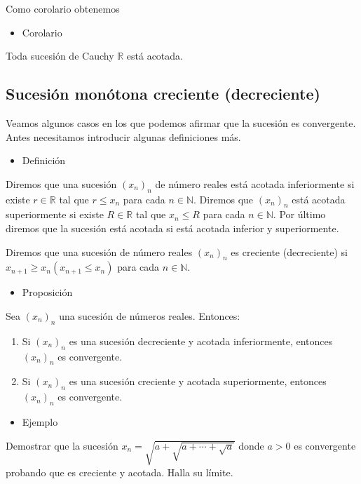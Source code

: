 \documentclass[12pt]{article}
\begin{document}
Como corolario obtenemos 

\begin{itemize}[label=\color{red}\textbullet, leftmargin=*]
	\item \color{lightblue}Corolario
\end{itemize}
Toda sucesión de Cauchy $\mathbb{R}$ está acotada.
\subsection{Sucesión monótona creciente (decreciente)}
Veamos algunos casos en los que podemos afirmar que la sucesión es convergente. Antes necesitamos introducir algunas definiciones más.
\begin{itemize}[label=\color{red}\textbullet, leftmargin=*]
	\item \color{lightblue}Definición
\end{itemize}
Diremos que una sucesión $(x_n)_n$ de número reales está acotada inferiormente si existe $r\in\mathbb{R}$ tal que $r\le x_n$ para cada $n\in\mathbb{N}$. Diremos que $(x_n)_n$ está acotada superiormente si existe $R\in\mathbb{R}$ tal que $x_n\le R$ para cada $n\in\mathbb{N}$. Por último diremos que la sucesión está acotada si está acotada inferior y superiormente.

Diremos que una sucesión de número reales $(x_n)_n$ es creciente (decreciente) si $x_{n+1}\ge x_n(x_{n+1}\le x_n)$ para cada $n\in\mathbb{N}$.
\begin{itemize}[label=\color{red}\textbullet, leftmargin=*]
	\item \color{lightblue}Proposición
\end{itemize}
Sea $(x_n)_n$ una sucesión de números reales. Entonces:
\begin{enumerate}[label=\arabic*)]
	\item Si $(x_n)_n$ es una sucesión decreciente y acotada inferiormente, entonces $(x_n)_n$ es convergente.
	\item Si $(x_n)_n$ es una sucesión creciente y acotada superiormente, entonces $(x_n)_n$ es convergente.
\end{enumerate}
\begin{itemize}[label=\color{red}\textbullet, leftmargin=*]
	\item \color{lightblue}Ejemplo
\end{itemize}
Demostrar que la sucesión $x_n=\sqrt{a+\sqrt{a+\cdots+\sqrt{a}}}$ donde $a>0$ es convergente probando que es creciente y acotada. Halla su límite.
\end{document}
